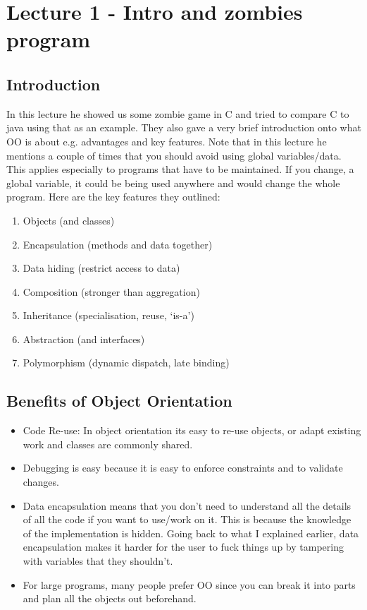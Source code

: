 \documentclass{article}
\begin{document}
\section{Lecture 1 - Intro and zombies program}

\subsection{Introduction}
In this lecture he showed us some zombie game in C and tried to compare C to java using that as an example. They also 
gave a very brief introduction onto what OO is about e.g. advantages and key features. Note that in this lecture he 
mentions a couple of times that you should avoid using global variables/data. This applies especially to programs that have 
to be maintained. If you change, a global variable, it could be being used anywhere and would change the whole program.
\newline
\newline
Here are the key features they outlined:
\begin{enumerate}
	\item	 {Objects (and classes)}
	\item	 {Encapsulation (methods and data together)}
	\item	 {Data hiding (restrict access to data)}
	\item	 {Composition (stronger than aggregation)}
	\item	 {Inheritance (specialisation, reuse, `is-a')}
	\item	 {Abstraction (and interfaces)}
	\item	 {Polymorphism (dynamic dispatch, late binding)}
\end{enumerate}

\subsection{Benefits of Object Orientation}

\begin{itemize}
	\item Code Re-use: In object orientation its easy to re-use objects, or adapt existing work
		and classes are commonly shared.
	\item Debugging is easy because it is easy to enforce constraints and to validate changes.
	\item Data encapsulation means that you don't need to understand all the details of all 
		the code if you want to use/work on it. This is because the knowledge of the implementation
		is hidden. Going back to what I explained earlier, data encapsulation makes it harder
	        for the user to fuck things up by tampering with variables that they shouldn't.
	\item  For large programs, many people prefer OO since you can break it into parts and plan
		all the objects out beforehand.

\end{itemize}
\end{document}
